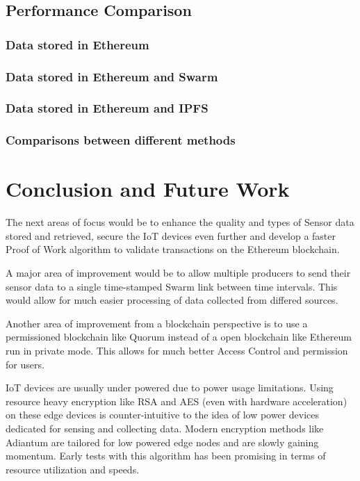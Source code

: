 \documentclass[11pt,openright]{report}
\begin{document}
\section{Performance Comparison}
\subsection{Data stored in Ethereum}
\subsection{Data stored in Ethereum and Swarm}
\subsection{Data stored in Ethereum and IPFS}
\subsection{Comparisons between different methods}


\chapter{Conclusion and Future Work} \label{chapter:conclusion}
The next areas of focus would be to enhance the quality and types of Sensor data stored and retrieved, secure the IoT devices even further and develop a faster Proof of Work algorithm to validate transactions on the Ethereum blockchain. 

A major area of improvement would be to allow multiple producers to send their sensor data to a single time-stamped Swarm link between time intervals. This would allow for much easier processing of data collected from differed sources.

Another area of improvement from a blockchain perspective is to use a permissioned blockchain like Quorum instead of a open blockchain like Ethereum run in private mode. This allows for much better Access Control and permission for users.

IoT devices are usually under powered due to power usage limitations. Using resource heavy encryption like RSA and AES (even with hardware acceleration) on these edge devices is counter-intuitive to the idea of low power devices dedicated for sensing and collecting data. Modern encryption methods like Adiantum are tailored for low powered edge nodes and are slowly gaining momentum. Early tests with this algorithm has been promising in terms of resource utilization and speeds.
\end{document}
